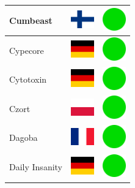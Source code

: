 \documentclass[12pt, a4paper, twoside]{report}
\begin{document}
\begin{center}
\begin{longtable}{|p{5cm}|p{2cm}|p{2cm}|}
 Cumbeast                                                   & \includegraphics[width=1cm]{../img/flags/fi} &   \includegraphics[width=1cm]{../likes/y} \\ \hline
 Cypecore                                                   & \includegraphics[width=1cm]{../img/flags/de} &   \includegraphics[width=1cm]{../likes/y} \\ \hline
 Cytotoxin                                                  & \includegraphics[width=1cm]{../img/flags/de} &   \includegraphics[width=1cm]{../likes/y} \\ \hline
 Czort                                                      & \includegraphics[width=1cm]{../img/flags/pl} &   \includegraphics[width=1cm]{../likes/y} \\ \hline
 Dagoba                                                     & \includegraphics[width=1cm]{../img/flags/fr} &   \includegraphics[width=1cm]{../likes/y} \\ \hline
 Daily Insanity                                             & \includegraphics[width=1cm]{../img/flags/de} &   \includegraphics[width=1cm]{../likes/y} \\ \hline

\end{longtable}
\end{center}
\end{document}

